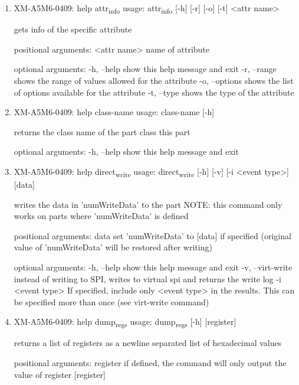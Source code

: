 \documentclass[11pt]{article}
\begin{document}
\begin{enumerate}
\item XM-A5M6-0409: help attr\textsubscript{info}
\label{sec:orgf56bfb3}
usage: attr\textsubscript{info} [-h] [-r] [-o] [-t] <attr name>

gets info of the specific attribute

positional arguments:
  <attr name>    name of attribute

optional arguments:
  -h, --help     show this help message and exit
  -r, --range    shows the range of values allowed for the attribute
  -o, --options  shows the list of options available for the attribute
  -t, --type     shows the type of the attribute

\item XM-A5M6-0409: help class-name
\label{sec:org0925646}
usage: class-name [-h]

returns the class name of the part class this part

optional arguments:
  -h, --help  show this help message and exit

\item XM-A5M6-0409: help direct\textsubscript{write}
\label{sec:org3a2cfd7}
usage: direct\textsubscript{write} [-h] [-v] [-i <event type>] [data]

writes the data in 'numWriteData' to the part NOTE: this command only works on
parts where 'numWriteData' is defined

positional arguments:
  data              set 'numWriteData' to [data] if specified (original value
                    of 'numWriteData' will be restored after writing)

optional arguments:
  -h, --help        show this help message and exit
  -v, --virt-write  instead of writing to SPI, writes to virtual spi and
                    returns the write log
  -i <event type>   If specified, include only <event type> in the results.
                    This can be specified more than once (see virt-write
                    command)

\item XM-A5M6-0409: help dump\textsubscript{regs}
\label{sec:orgc2b3ed1}
usage: dump\textsubscript{regs} [-h] [register]

returns a list of registers as a newline separated list of hexadecimal values

positional arguments:
  register    if defined, the command will only output the value of register
              [register]


\end{enumerate}
\end{document}
